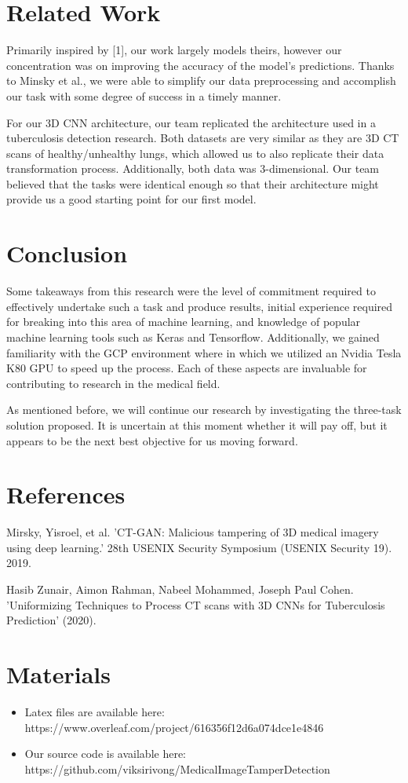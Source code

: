 \documentclass[conference]{IEEEtran}
\begin{document}
\section{Related Work}
Primarily inspired by [1], our work largely models theirs, however our concentration was on improving the accuracy of the model's predictions. Thanks to Minsky et al., we were able to simplify our data preprocessing and accomplish our task with some degree of success in a timely manner.
\par
For our 3D CNN architecture, our team replicated the architecture used in a tuberculosis detection research. Both datasets are very similar as they are 3D CT scans of healthy/unhealthy lungs, which allowed us to also replicate their data transformation process. Additionally, both data was 3-dimensional. Our team believed that the tasks were identical enough so that their architecture might provide us a good starting point for our first model. 
\section{Conclusion}
Some takeaways from this research were the level of commitment required to effectively undertake such a task and produce results, initial experience required for breaking into this area of machine learning, and knowledge of popular machine learning tools such as Keras and Tensorflow. Additionally, we gained familiarity with the GCP environment where in which we utilized an Nvidia Tesla K80 GPU to speed up the process. Each of these aspects are invaluable for contributing to research in the medical field.
\par
As mentioned before, we will continue our research by investigating the three-task solution proposed. It is uncertain at this moment whether it will pay off, but it appears to be the next best objective for us moving forward.

\section{References}
\begin{thebibliography}{9}
    Mirsky, Yisroel, et al. 'CT-GAN: Malicious tampering of 3D medical imagery using deep learning.' 28th {USENIX} Security Symposium ({USENIX} Security 19). 2019.
    
    Hasib Zunair, Aimon Rahman, Nabeel Mohammed, Joseph Paul Cohen. 'Uniformizing Techniques to Process CT scans with 3D CNNs for Tuberculosis Prediction' (2020).
    
\end{thebibliography}

\section{Materials}
\begin{itemize}
    \item Latex files are available here: https://www.overleaf.com/project/616356f12d6a074dce1e4846
    \item Our source code is available here: https://github.com/viksirivong/MedicalImageTamperDetection
\end{itemize}
\end{document}
